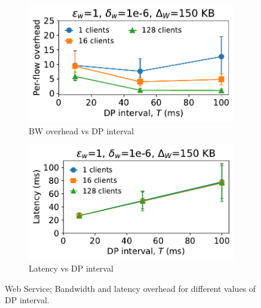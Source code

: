 \begin{figure}[t]
  \centering
  \begin{subfigure}{0.49\columnwidth}
      \centering
      \includegraphics[width=\textwidth]{plots/overhead_vs_dp_interval_web.pdf}
      \caption{BW overhead vs DP interval}
      \label{fig:web-overhead-vs-dpInt}
  \end{subfigure}
  \hfill
  \begin{subfigure}{0.49\columnwidth}
      \centering
      \includegraphics[width=\textwidth]{plots/latency_vs_dp_interval_web.pdf}
      \caption{Latency vs DP interval}
      \label{fig:web-latency-vs-dpInt}
  \end{subfigure}
  \caption{Web Service; Bandwidth and latency overhead for different values of DP interval.
  }
\end{figure}

